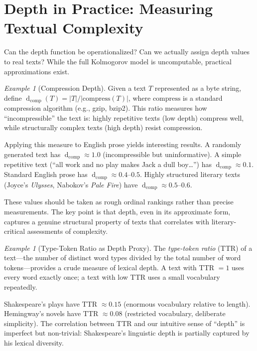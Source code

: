 \documentclass[11pt,openany]{book}
\theoremstyle{definition}
\theoremstyle{plain}
\theoremstyle{remark}
\newtheorem{example}[axiom]{Example}
\newcommand{\depth}{\operatorname{d}}       %
\begin{document}
\section{Depth in Practice: Measuring Textual Complexity}

Can the depth function be operationalized? Can we actually assign depth values to real texts? While the full Kolmogorov model is uncomputable, practical approximations exist.

\begin{example}[Compression Depth]
Given a text $T$ represented as a byte string, define $\depth_{\mathrm{comp}}(T) = |T|/|\mathrm{compress}(T)|$, where $\mathrm{compress}$ is a standard compression algorithm (e.g., gzip, bzip2). This ratio measures how ``incompressible'' the text is: highly repetitive texts (low depth) compress well, while structurally complex texts (high depth) resist compression.

Applying this measure to English prose yields interesting results. A randomly generated text has $\depth_{\mathrm{comp}} \approx 1.0$ (incompressible but uninformative). A simple repetitive text (``all work and no play makes Jack a dull boy\ldots'') has $\depth_{\mathrm{comp}} \approx 0.1$. Standard English prose has $\depth_{\mathrm{comp}} \approx 0.4$--$0.5$. Highly structured literary texts (Joyce's \emph{Ulysses}, Nabokov's \emph{Pale Fire}) have $\depth_{\mathrm{comp}} \approx 0.5$--$0.6$.

These values should be taken as rough ordinal rankings rather than precise measurements. The key point is that depth, even in its approximate form, captures a genuine structural property of texts that correlates with literary-critical assessments of complexity.
\end{example}

\begin{example}[Type-Token Ratio as Depth Proxy]
The \emph{type-token ratio} (TTR) of a text---the number of distinct word types divided by the total number of word tokens---provides a crude measure of lexical depth. A text with TTR $= 1$ uses every word exactly once; a text with low TTR uses a small vocabulary repeatedly.

Shakespeare's plays have TTR $\approx 0.15$ (enormous vocabulary relative to length). Hemingway's novels have TTR $\approx 0.08$ (restricted vocabulary, deliberate simplicity). The correlation between TTR and our intuitive sense of ``depth'' is imperfect but non-trivial: Shakespeare's linguistic depth is partially captured by his lexical diversity.
\end{example}
\end{document}
